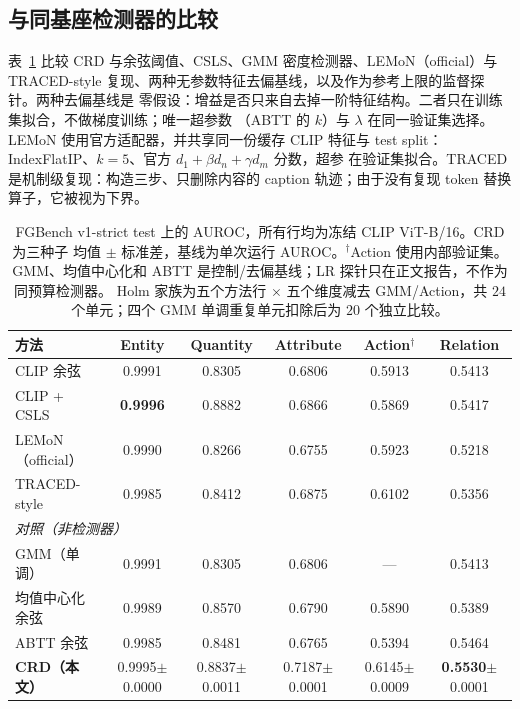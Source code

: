 \documentclass[10pt,twocolumn,a4paper]{ctexart}
\begin{document}
\subsection{与同基座检测器的比较}
表~\ref{tab:main-cn} 比较 CRD 与余弦阈值、CSLS、GMM 密度检测器、LEMoN（official）与
TRACED-style 复现、两种无参数特征去偏基线，以及作为参考上限的监督探针。两种去偏基线是
零假设：增益是否只来自去掉一阶特征结构。二者只在训练集拟合，不做梯度训练；唯一超参数
（ABTT 的 $k$）与 $\lambda$ 在同一验证集选择。LEMoN 使用官方适配器，并共享同一份缓存
CLIP 特征与 test split：IndexFlatIP、$k{=}5$、官方 $d_1+\beta d_n+\gamma d_m$ 分数，超参
在验证集拟合。TRACED 是机制级复现：构造三步、只删除内容的 caption 轨迹；由于没有复现
token 替换算子，它被视为下界。

\begin{table}[t]
\centering
\footnotesize
\setlength{\tabcolsep}{7pt}
\caption{FGBench v1-strict test 上的 AUROC，所有行均为冻结 CLIP ViT-B/16。CRD 为三种子
均值 $\pm$ 标准差，基线为单次运行 AUROC。$^\dagger$Action 使用内部验证集。
GMM、均值中心化和 ABTT 是控制/去偏基线；LR 探针只在正文报告，不作为同预算检测器。
Holm 家族为五个方法行 $\times$ 五个维度减去 GMM/Action，共 $24$ 个单元；四个 GMM
单调重复单元扣除后为 $20$ 个独立比较。}
\label{tab:main-cn}
\begin{tabular}{lccccc}
\toprule
方法 & Entity & Quantity & Attribute & Action$^\dagger$ & Relation \\
\midrule
CLIP 余弦                & 0.9991 & 0.8305 & 0.6806 & 0.5913 & 0.5413 \\
CLIP + CSLS              & \textbf{0.9996} & 0.8882 & 0.6866 & 0.5869 & 0.5417 \\
LEMoN（official）          & 0.9990 & 0.8266 & 0.6755 & 0.5923 & 0.5218 \\
TRACED-style             & 0.9985 & 0.8412 & 0.6875 & 0.6102 & 0.5356 \\
\midrule
\multicolumn{6}{l}{\emph{对照（非检测器）}}\\
GMM（单调）              & 0.9991 & 0.8305 & 0.6806 & --- & 0.5413 \\
均值中心化余弦            & 0.9989 & 0.8570 & 0.6790 & 0.5890 & 0.5389 \\
ABTT 余弦                & 0.9985 & 0.8481 & 0.6765 & 0.5394 & 0.5464 \\
\midrule
\textbf{CRD（本文）}      & 0.9995$\pm$0.0000 & 0.8837$\pm$0.0011 & 0.7187$\pm$0.0001 & 0.6145$\pm$0.0009 & \textbf{0.5530}$\pm$0.0001 \\
\bottomrule
\end{tabular}
\end{table}
\end{document}
